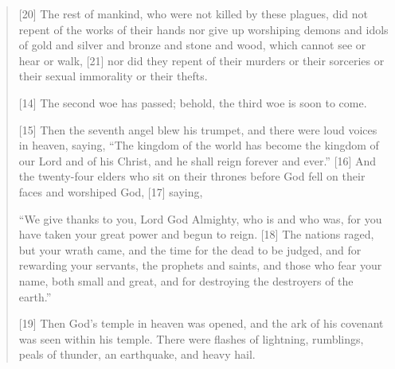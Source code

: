 \begin{quote}
    [20] The rest of mankind, who were not killed by these plagues, did not repent of the works of their hands nor give up worshiping demons and idols of gold and silver and bronze and stone and wood, which cannot see or hear or walk, [21] nor did they repent of their murders or their sorceries or their sexual immorality or their thefts.

    [14] The second woe has passed; behold, the third woe is soon to come.

    [15] Then the seventh angel blew his trumpet, and there were loud voices in heaven, saying, “The kingdom of the world has become the kingdom of our Lord and of his Christ, and he shall reign forever and ever.” [16] And the twenty-four elders who sit on their thrones before God fell on their faces and worshiped God, [17] saying,

    “We give thanks to you, Lord God Almighty,
        who is and who was,
    for you have taken your great power
        and begun to reign.
    [18] The nations raged,
        but your wrath came,
        and the time for the dead to be judged,
    and for rewarding your servants, the prophets and saints,
        and those who fear your name,
        both small and great,
    and for destroying the destroyers of the earth.”

    [19] Then God’s temple in heaven was opened, and the ark of his covenant was seen within his temple. There were flashes of lightning, rumblings, peals of thunder, an earthquake, and heavy hail.

  \end{quote}

